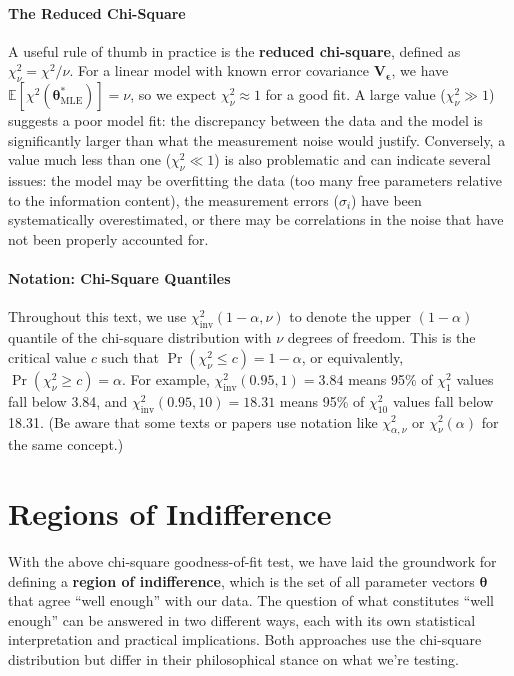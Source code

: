 \paragraph*{The Reduced Chi-Square}
A useful rule of thumb in practice is the \textbf{reduced chi-square}, defined as $\chi^2_\nu = \chi^2 / \nu$. For a linear model with known error covariance $\mathbf{V}_{\boldsymbol{\epsilon}}$, we have $\mathbb{E}[\chi^2(\boldsymbol{\theta}^*_{\text{MLE}})] = \nu$, so we expect $\chi^2_\nu \approx 1$ for a good fit. A large value ($\chi^2_\nu \gg 1$) suggests a poor model fit: the discrepancy between the data and the model is significantly larger than what the measurement noise would justify. Conversely, a value much less than one ($\chi^2_\nu \ll 1$) is also problematic and can indicate several issues: the model may be overfitting the data (too many free parameters relative to the information content), the measurement errors ($\sigma_i$) have been systematically overestimated, or there may be correlations in the noise that have not been properly accounted for. 

\paragraph*{Notation: Chi-Square Quantiles}
Throughout this text, we use $\chi^2_{\text{inv}}(1-\alpha, \nu)$ to denote the upper $(1-\alpha)$ quantile of the chi-square distribution with $\nu$ degrees of freedom. This is the critical value $c$ such that $\Pr(\chi^2_\nu \le c) = 1-\alpha$, or equivalently, $\Pr(\chi^2_\nu \ge c) = \alpha$. For example, $\chi^2_{\text{inv}}(0.95, 1) = 3.84$ means 95\% of $\chi^2_1$ values fall below 3.84, and $\chi^2_{\text{inv}}(0.95, 10) = 18.31$ means 95\% of $\chi^2_{10}$ values fall below 18.31. (Be aware that some texts or papers use notation like $\chi^2_{\alpha,\nu}$ or $\chi^2_{\nu}(\alpha)$ for the same concept.)


\section{Regions of Indifference}
With the above chi-square goodness-of-fit test, we have laid the groundwork for defining a \textbf{region of indifference}, which is the set of all parameter vectors $\boldsymbol{\theta}$ that agree ``well enough'' with our data. The question of what constitutes ``well enough'' can be answered in two different ways, each with its own statistical interpretation and practical implications. Both approaches use the chi-square distribution but differ in their philosophical stance on what we're testing.

